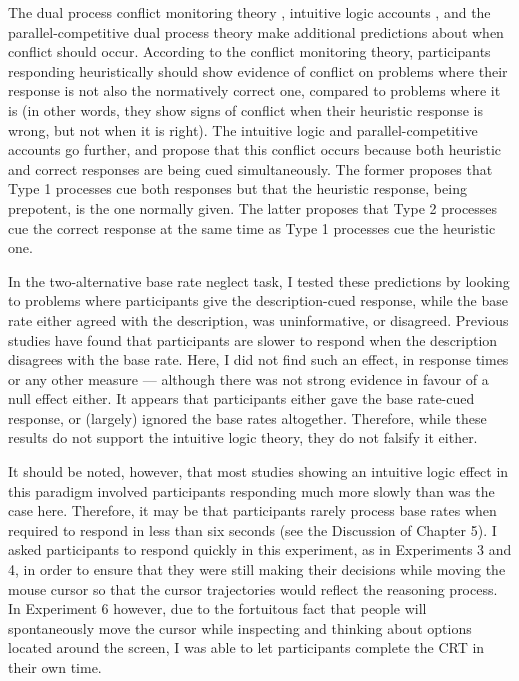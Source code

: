 The dual process conflict monitoring theory \citep[e.g.][]{DeNeys2008,DeNeys2008a},
intuitive logic accounts \citep{DeNeys2012,DeNeys2014a,Handley2015},
and the parallel-competitive dual process theory \citep{Sloman2014,Sloman1996}
make additional predictions about when conflict should occur.
According to the conflict monitoring theory, participants responding heuristically
should show evidence of conflict on problems where
their response is not also the normatively correct one,
compared to problems where it is
(in other words, they show signs of conflict when
their heuristic response is wrong, but not when it is right).
The intuitive logic and parallel-competitive accounts go further,
and propose that this conflict occurs because both
heuristic and correct responses are being cued simultaneously.
The former proposes that Type 1 processes cue both responses
but that the heuristic response, being prepotent, is the one normally given.
The latter proposes that Type 2 processes cue the correct response
at the same time as Type 1 processes cue the heuristic one.

In the two-alternative base rate neglect task,
I tested these predictions by looking to problems where
participants give the description-cued response,
while the base rate either agreed with the description,
was uninformative, or disagreed.
Previous studies \citep[i.e.][]{DeNeys2008a,DeNeys2008,Pennycook2012a,Pennycook2014}
have found that participants are slower to respond
when the description disagrees with the base rate.
Here, I did not find such an effect,
in response times or any other measure ---
although there was not strong evidence in favour of a null effect either.
It appears that participants either
gave the base rate-cued response, or (largely) ignored the base rates altogether.
Therefore, while these results do not support the intuitive logic theory,
they do not falsify it either.

It should be noted, however,
that most studies showing an intuitive logic effect in this paradigm
involved participants responding much more slowly than was the case here.
Therefore, it may be that participants rarely process base rates
when required to respond in less than six seconds (see the Discussion of Chapter 5).
I asked participants to respond quickly in this experiment,
as in Experiments 3 and 4, in order to ensure that
they were still making their decisions while moving the mouse cursor
so that the cursor trajectories would reflect the reasoning process.
In Experiment 6 however,
due to the fortuitous fact that people will
spontaneously move the cursor while inspecting and thinking about
options located around the screen,
I was able to let participants complete the CRT in their own time.

